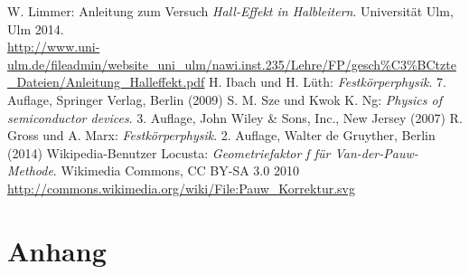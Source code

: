 \documentclass[a4paper, parskip=half, 12pt, bibliography=totocnumbered]{scrartcl}
\begin{document}





\begin{thebibliography}{10}
 W. Limmer: Anleitung zum Versuch \emph{Hall-Effekt in Halbleitern}. Universität Ulm, Ulm 2014.\\
\url{http://www.uni-ulm.de/fileadmin/website_uni_ulm/nawi.inst.235/Lehre/FP/gesch%C3%BCtzte_Dateien/Anleitung_Halleffekt.pdf}
 H. Ibach und H. Lüth: \emph{Festkörperphysik}. 7. Auflage, Springer Verlag, Berlin (2009)
 S. M. Sze und Kwok K. Ng: \emph{Physics of semiconductor devices}. 3. Auflage, John Wiley \& Sons, Inc., New Jersey (2007)
 R. Gross und A. Marx: \emph{Festkörperphysik}. 2. Auflage, Walter de Gruyther, Berlin (2014)
 Wikipedia-Benutzer Locusta: \emph{Geometriefaktor f für Van-der-Pauw-Methode}. Wikimedia Commons, CC BY-SA 3.0 2010\\ \url{http://commons.wikimedia.org/wiki/File:Pauw_Korrektur.svg}
\end{thebibliography}

\newpage
\section{Anhang}
\vspace{2em}
\begin{addmargin}[-3em]{3em}

\end{addmargin}
\end{document}
